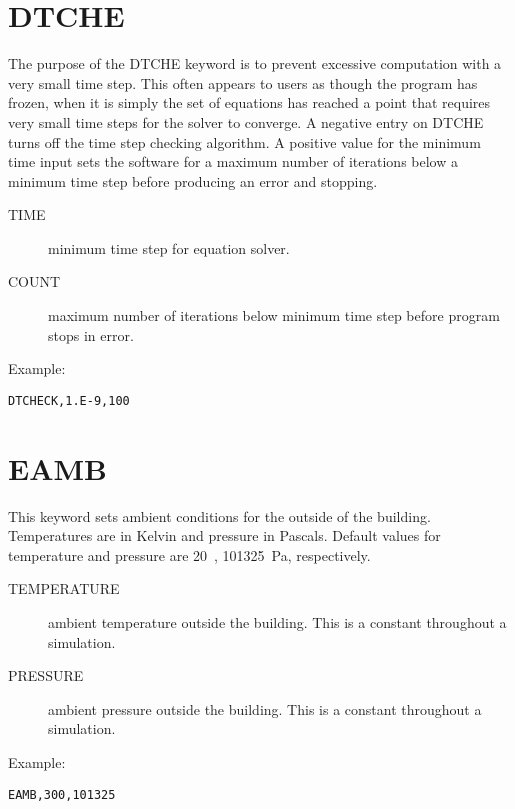 \section{DTCHE}

The purpose of the DTCHE keyword is to prevent excessive computation with a very small time step. This often appears to users as though the program has frozen, when it is simply the set of equations has reached a point that requires very small time steps for the solver to converge. A negative entry on DTCHE turns off the time step checking algorithm. A positive value for the minimum time input sets the software for a maximum number of iterations below a minimum time step before producing an error and stopping.
\begin{adjustwidth}{1cm}{0cm}
\begin{description}
  \item[TIME] minimum time step for equation solver.
  \item[COUNT] maximum number of iterations below minimum time step before program stops in error.
\end{description}
\end{adjustwidth}

\noindent Example:
\begin{lstlisting}
DTCHECK,1.E-9,100
\end{lstlisting}

\section{EAMB}

This keyword sets ambient conditions for the outside of the building. Temperatures are in Kelvin and pressure in Pascals. Default values for temperature and pressure are 20~\degc, 101325~Pa, respectively.
\begin{adjustwidth}{1cm}{0cm}
\begin{description}
  \item[TEMPERATURE] ambient temperature outside the building.  This is a constant throughout a simulation.
  \item[PRESSURE] ambient pressure outside the building. This is a constant throughout a simulation.
\end{description}
\end{adjustwidth}

\noindent Example:

\begin{lstlisting}
EAMB,300,101325
\end{lstlisting}

